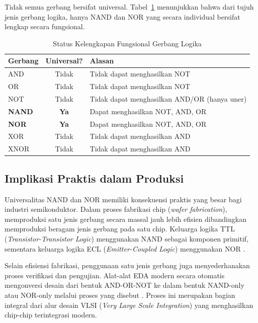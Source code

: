 Tidak semua gerbang bersifat universal. Tabel~\ref{tab:universalitas} menunjukkan bahwa dari tujuh jenis gerbang logika, hanya NAND dan NOR yang secara individual bersifat lengkap secara fungsional.

\begin{table}[H]
\centering
\renewcommand{\arraystretch}{1.3}
\begin{tabular}{|l|c|l|}
\hline
\textbf{Gerbang} & \textbf{Universal?} & \textbf{Alasan} \\ \hline
AND & Tidak & Tidak dapat menghasilkan NOT \\ \hline
OR & Tidak & Tidak dapat menghasilkan NOT \\ \hline
NOT & Tidak & Tidak dapat menghasilkan AND/OR (hanya uner) \\ \hline
\textbf{NAND} & \textbf{Ya} & Dapat menghasilkan NOT, AND, OR \\ \hline
\textbf{NOR} & \textbf{Ya} & Dapat menghasilkan NOT, AND, OR \\ \hline
XOR & Tidak & Tidak dapat menghasilkan AND \\ \hline
XNOR & Tidak & Tidak dapat menghasilkan AND \\ \hline
\end{tabular}
\caption{Status Kelengkapan Fungsional Gerbang Logika}
\label{tab:universalitas}
\end{table}

\subsection{Implikasi Praktis dalam Produksi}

Universalitas NAND dan NOR memiliki konsekuensi praktis yang besar bagi industri semikonduktor. Dalam proses fabrikasi chip (\textit{wafer fabrication}), memproduksi satu jenis gerbang secara massal jauh lebih efisien dibandingkan memproduksi beragam jenis gerbang pada satu chip. Keluarga logika TTL (\textit{Transistor-Transistor Logic}) menggunakan NAND sebagai komponen primitif, sementara keluarga logika ECL (\textit{Emitter-Coupled Logic}) menggunakan NOR \cite{electronics_tutorials_gates}.

Selain efisiensi fabrikasi, penggunaan satu jenis gerbang juga menyederhanakan proses verifikasi dan pengujian. Alat-alat EDA modern secara otomatis mengonversi desain dari bentuk AND-OR-NOT ke dalam bentuk NAND-only atau NOR-only melalui proses yang disebut . Proses ini merupakan bagian integral dari alur desain VLSI (\textit{Very Large Scale Integration}) yang menghasilkan chip-chip terintegrasi modern.
